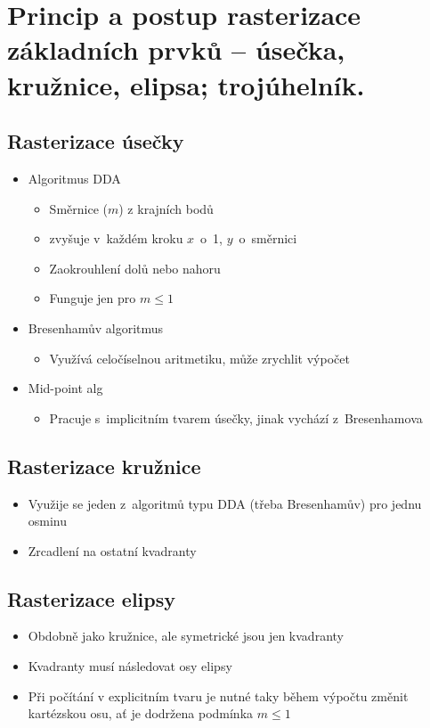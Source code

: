 \section{Princip a postup rasterizace základních prvků – úsečka, kružnice, elipsa; trojúhelník.}
\subsection{Rasterizace úsečky}
\begin{itemize}
    \item Algoritmus DDA
    \begin{itemize}
        \item Směrnice (\(m\)) z krajních bodů
        \item zvyšuje v~každém kroku \(x\)~o~1, \(y\)~o~směrnici
        \item Zaokrouhlení dolů nebo nahoru
        \item Funguje jen pro \(m\leq1\)
    \end{itemize}
    \item Bresenhamův algoritmus
    \begin{itemize}
        \item Využívá celočíselnou aritmetiku, může zrychlit výpočet
    \end{itemize}
    \item Mid-point alg
    \begin{itemize}
        \item Pracuje s~implicitním tvarem úsečky, jinak vychází z~Bresenhamova
    \end{itemize}
\end{itemize}

\subsection{Rasterizace kružnice}
\begin{itemize}
    \item Využije se jeden z~algoritmů typu DDA (třeba Bresenhamův) pro jednu osminu
    \item Zrcadlení na ostatní kvadranty
\end{itemize}

\subsection{Rasterizace elipsy}
\begin{itemize}
    \item Obdobně jako kružnice, ale symetrické jsou jen kvadranty
    \item Kvadranty musí následovat osy elipsy
    \item Při počítání v explicitním tvaru je nutné taky během výpočtu změnit kartézskou osu, ať je dodržena podmínka \(m\leq1\)
\end{itemize}

